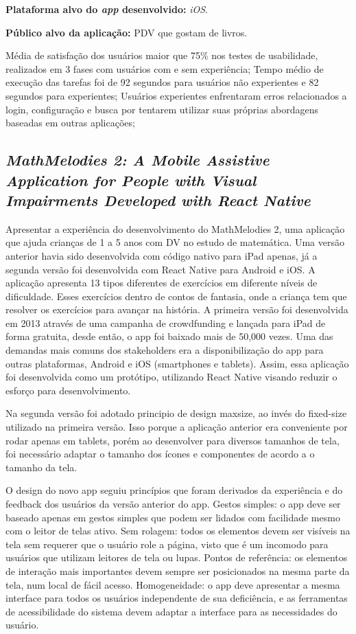 \textbf{Plataforma alvo do \emph{app} desenvolvido:} \emph{iOS}.

\textbf{Público alvo da aplicação:} PDV que gostam de livros\@.

Média de satisfação dos usuários maior que 75\% nos testes de usabilidade, realizados em 3 fases com usuários com e sem experiência;
Tempo médio de execução das tarefas foi de 92 segundos para usuários não experientes e 82 segundos para experientes;
Usuários experientes enfrentaram erros relacionados a login, configuração e busca por tentarem utilizar suas próprias abordagens baseadas em outras aplicações;

\subsection{\emph{MathMelodies 2: A Mobile Assistive Application for People with Visual Impairments Developed with React Native}}

Apresentar a experiência do desenvolvimento do MathMelodies 2, uma aplicação que ajuda crianças de 1 a 5 anos com DV no estudo de matemática.
Uma versão anterior havia sido desenvolvida com código nativo para iPad apenas, já a segunda versão foi desenvolvida com React Native para Android e iOS.
A aplicação apresenta 13 tipos diferentes de exercícios em diferente níveis de dificuldade.
Esses exercícios dentro de contos de fantasia, onde a criança tem que resolver os exercícios para avançar na história.
A primeira versão foi desenvolvida em 2013 através de uma campanha de crowdfunding e lançada para iPad de forma gratuita, desde então, o app foi baixado mais de 50,000 vezes.
Uma das demandas mais comuns dos stakeholders era a disponibilização do app para outras plataformas, Android e iOS (smartphones e tablets).
Assim, essa aplicação foi desenvolvida como um protótipo, utilizando React Native visando reduzir o esforço para desenvolvimento.

Na segunda versão foi adotado principio de design maxsize, ao invés do fixed-size utilizado na primeira versão.
Isso porque a aplicação anterior era conveniente por rodar apenas em tablets, porém ao desenvolver para diversos tamanhos de tela, foi necessário adaptar o tamanho dos ícones e componentes de acordo a o tamanho da tela.

O design do novo app seguiu princípios que foram derivados da experiência e do feedback dos usuários da versão anterior do app.
Gestos simples: o app deve ser baseado apenas em gestos simples que podem ser lidados com facilidade mesmo com o leitor de telas ativo.
Sem rolagem: todos os elementos devem ser visíveis na tela sem requerer que o usuário role a página, visto que é um incomodo para usuários que utilizam leitores de tela ou lupas.
Pontos de referência: os elementos de interação mais importantes devem sempre ser posicionados na mesma parte da tela, num local de fácil acesso.
Homogeneidade: o app deve apresentar a mesma interface para todos os usuários independente de sua deficiência, e as ferramentas de acessibilidade do sistema devem adaptar a interface para as necessidades do usuário.

